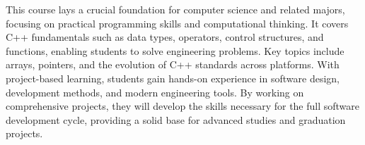 This course lays a crucial foundation for computer science and related majors, focusing on practical programming skills and computational thinking. It covers C++ fundamentals such as data types, operators, control structures, and functions, enabling students to solve engineering problems. Key topics include arrays, pointers, and the evolution of C++ standards across platforms. With project-based learning, students gain hands-on experience in software design, development methods, and modern engineering tools. By working on comprehensive projects, they will develop the skills necessary for the full software development cycle, providing a solid base for advanced studies and graduation projects.